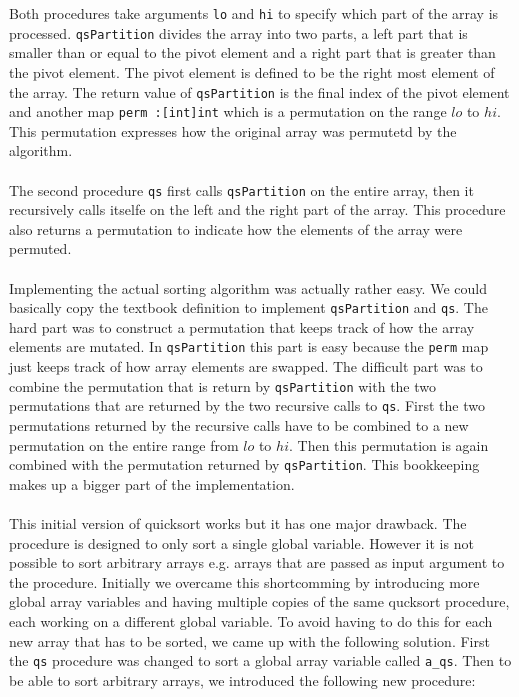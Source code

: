 Both procedures take arguments \texttt{lo} and \texttt{hi} to specify which part of the array is processed.
\texttt{qsPartition} divides the array into two parts, a left part that is smaller than or equal to the pivot
element and a right part that is greater than the pivot element. The pivot element is defined to be the right most element of the array. 
The return value of \texttt{qsPartition} is the final index of the pivot element and another map \texttt{perm :[int]int} which is a permutation
on the range $lo$ to $hi$. This permutation expresses how the original array was permutetd by the algorithm.
\\\\
The second procedure \texttt{qs} first calls \texttt{qsPartition} on the entire array, 
then it recursively calls itselfe on the left and the right part of the array. This procedure also returns 
a permutation to indicate how the elements of the array were permuted.
\\\\
Implementing the actual sorting algorithm was actually rather easy. We could basically copy the textbook definition to implement
\texttt{qsPartition} and \texttt{qs}. The hard part was to construct a permutation that keeps track of how the array elements are mutated.
In \texttt{qsPartition} this part is easy because the \texttt{perm} map just keeps track of how array elements are swapped. The difficult part was to
combine the permutation that is return by \texttt{qsPartition} with the two permutations that are returned by the two recursive calls to \texttt{qs}.
First the two permutations returned by the recursive calls have to be combined to a new permutation on the entire range from $lo$ to $hi$. Then this permutation
is again combined with the permutation returned by \texttt{qsPartition}. This bookkeeping makes up a bigger part of the implementation.
\\\\ 
This initial version of quicksort works but it has one major drawback. The procedure is designed to only sort a single global variable. However
it is not possible to sort arbitrary arrays e.g. arrays that are passed as input argument to the procedure. Initially we overcame this shortcomming
by introducing more global array variables and having multiple copies of the same qucksort procedure, each working on a different global variable.
To avoid having to do this for each new array that has to be sorted, we came up with the following solution. First the \texttt{qs} procedure was changed
to sort a global array variable called \texttt{a\_qs}. Then to be able to sort arbitrary arrays, we 
introduced the following new procedure:

